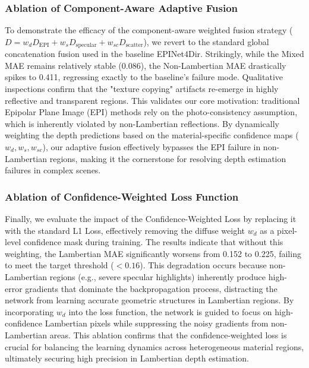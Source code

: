 \subsubsection{Ablation of Component-Aware Adaptive Fusion}
To demonstrate the efficacy of the component-aware weighted fusion strategy ($D = w_d D_{\text{EPI}} + w_s D_{\text{specular}} + w_{sc} D_{\text{scatter}}$), we revert to the standard global concatenation fusion used in the baseline EPINet4Dir. Strikingly, while the Mixed MAE remains relatively stable (0.086), the Non-Lambertian MAE drastically spikes to 0.411, regressing exactly to the baseline's failure mode. Qualitative inspections confirm that the "texture copying" artifacts re-emerge in highly reflective and transparent regions. This validates our core motivation: traditional Epipolar Plane Image (EPI) methods rely on the photo-consistency assumption, which is inherently violated by non-Lambertian reflections. By dynamically weighting the depth predictions based on the material-specific confidence maps ($w_d, w_s, w_{sc}$), our adaptive fusion effectively bypasses the EPI failure in non-Lambertian regions, making it the cornerstone for resolving depth estimation failures in complex scenes.

\subsubsection{Ablation of Confidence-Weighted Loss Function}
Finally, we evaluate the impact of the Confidence-Weighted Loss by replacing it with the standard L1 Loss, effectively removing the diffuse weight $w_d$ as a pixel-level confidence mask during training. The results indicate that without this weighting, the Lambertian MAE significantly worsens from 0.152 to 0.225, failing to meet the target threshold ($<0.16$). This degradation occurs because non-Lambertian regions (e.g., severe specular highlights) inherently produce high-error gradients that dominate the backpropagation process, distracting the network from learning accurate geometric structures in Lambertian regions. By incorporating $w_d$ into the loss function, the network is guided to focus on high-confidence Lambertian pixels while suppressing the noisy gradients from non-Lambertian areas. This ablation confirms that the confidence-weighted loss is crucial for balancing the learning dynamics across heterogeneous material regions, ultimately securing high precision in Lambertian depth estimation.